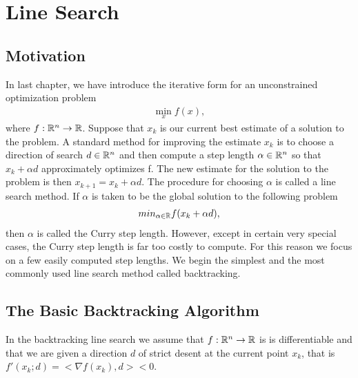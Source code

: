 \chapter{Line Search}\label{chp:Line Search}


\section{Motivation}
    In last chapter, we have introduce the iterative form for an unconstrained optimization problem
    \begin{align*}
        \min_{x} f(x),
    \end{align*}
    where $f:\mathbb{R}^n\rightarrow \mathbb{R}$. Suppose that $x_k$ is our current best estimate of a solution to the problem. 
    A standard method for improving the estimate $x_k$ is to choose a direction of search $d \in \mathbb{R}^n$ and then compute a step length $\alpha \in \mathbb{R}^n$ so that $x_k+\alpha d$ approximately optimizes f. 
    The new estimate for the solution to the problem is then $x_{k+1}=x_k + \alpha d$. The procedure for choosing $\alpha$ is called a line search method. If $\alpha$ is taken to be the
    global solution to the following problem
    \begin{align*}
        min_{\alpha \in \mathbb{R}} f(x_k+\alpha d), 
    \end{align*}
    then $\alpha$ is called the Curry step length.  However, except in certain very special cases, the
    Curry step length is far too costly to compute. For this reason we focus on a few easily
    computed step lengths. We begin the simplest and the most commonly used line search
    method called backtracking.     
    
\section{The Basic Backtracking Algorithm}
In the backtracking line search we assume
that $f:\mathbb{R}^n\rightarrow \mathbb{R}$ is is differentiable and that we are given a direction $d$ of strict desent at the current point $x_k$, that is $f'(x_k;d)=<\nabla f(x_k),d><0$.


